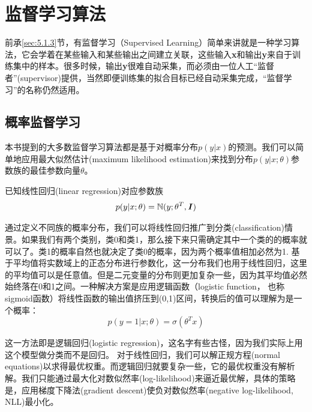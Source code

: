 
\section{监督学习算法}
\label{sec:5.7}
前承\ref{sec:5.1.3}节，有监督学习（Supervised Learning）简单来讲就是一种学习算法，它会学着在某些输入和某些输出之间建立关联，这些输入\textbf{x}和输出\textbf{y}来自于训练集中的样本。很多时候，输出\textbf{y}很难自动采集，而必须由一位人工“监督者”(supervisor)提供，当然即便训练集的拟合目标已经自动采集完成，“监督学习”的名称仍然适用。
\subsection{概率监督学习}
\label{sec.5.7.1}
本书提到的大多数监督学习算法都是基于对概率分布$p(y|x)$的预测。我们可以简单地应用最大似然估计(maximum likelihood estimation)来找到分布$p(y|x;\theta)$参数族的最佳参数向量$\theta$。

已知线性回归(linear regression)对应参数族
\begin{equation}
	p(y|x;\theta) = \mathbb{N} (y;\theta^{T}, \textbf{\textit{I}})
  	\label{form:5.80}
\end{equation}

通过定义不同族的概率分布，我们可以将线性回归推广到分类(classification)情景。如果我们有两个类别，类0和类1，那么接下来只需确定其中一个类的的概率就可以了。类1的概率自然也就决定了类0的概率，因为两个概率值相加必然为1.
基于平均值将实数域上的正态分布进行参数化，这一分布我们也用于线性回归，这里的平均值可以是任意值。但是二元变量的分布则更加复杂一些，因为其平均值必然始终落在0和1之间。一种解决方案是应用逻辑函数（logistic function， 也称sigmoid函数）将线性函数的输出值挤压到(0,1)区间，转换后的值可以理解为是一个概率：
\begin{equation}
	p(y=1|x;\theta) = \sigma (\theta^{T}x)
  	\label{form:5.80}
\end{equation}

这一方法即是逻辑回归(logistic regression)，这名字有些古怪，因为我们实际上用这个模型做分类而不是回归。
对于线性回归，我们可以解正规方程(normal equations)以求得最优权重。而逻辑回归就要复杂一些，它的最优权重没有解析解。我们只能通过最大化对数似然率(log-likelihood)来逼近最优解，具体的策略是，应用梯度下降法(gradient descent)使负对数似然率(negative log-likelihood, NLL)最小化。

